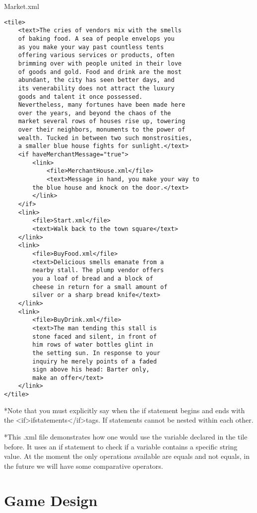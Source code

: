 \documentclass[11pt]{article}
\begin{document}
Market.xml
\begin{lstlisting}[frame=single]
<tile>
	<text>The cries of vendors mix with the smells 
	of baking food. A sea of people envelops you 
	as you make your way past countless tents 
	offering various services or products, often 
	brimming over with people united in their love 
	of goods and gold. Food and drink are the most 
	abundant, the city has seen better days, and 
	its venerability does not attract the luxury 
	goods and talent it once possessed. 
	Nevertheless, many fortunes have been made here 
	over the years, and beyond the chaos of the 
	market several rows of houses rise up, towering 
	over their neighbors, monuments to the power of 
	wealth. Tucked in between two such monstrosities, 
	a smaller blue house fights for sunlight.</text>
	<if haveMerchantMessage="true">
        <link>
            <file>MerchantHouse.xml</file>
            <text>Message in hand, you make your way to 
		the blue house and knock on the door.</text>
        </link>
    </if>
    <link>
		<file>Start.xml</file>
		<text>Walk back to the town square</text>
	</link>
	<link>
		<file>BuyFood.xml</file>
		<text>Delicious smells emanate from a 
		nearby stall. The plump vendor offers 
		you a loaf of bread and a block of 
		cheese in return for a small amount of 
		silver or a sharp bread knife</text>
	</link>
	<link>
		<file>BuyDrink.xml</file>
		<text>The man tending this stall is 
		stone faced and silent, in front of 
		him rows of water bottles glint in 
		the setting sun. In response to your 
		inquiry he merely points of a faded 
		sign above his head: Barter only, 
		make an offer</text>
	</link>
</tile>
\end{lstlisting}

*Note that you must explicitly say when the if statement begins and ends with the \textless if\textgreater ifstatements\textless /if\textgreater tags. If statements cannot be nested within each other. 

*This .xml file demonstrates how one would use the variable declared in the tile before. It uses an if statement to check if a variable contains a specific string value. At the moment the only operations available are equals and not equals, in the future we will have some comparative operators.


\section{Game Design}
\end{document}
